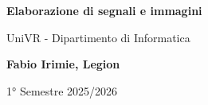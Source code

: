 \begin{titlepage}
	\begin{center}
		\vspace*{1cm}

		\Huge
		\textbf{Elaborazione di segnali e immagini}

		\vspace{0.5cm}
		\LARGE
		UniVR - Dipartimento di Informatica

		\vspace{1.5cm}

		\textbf{Fabio Irimie, Legion}

		\vfill


		\vspace{0.8cm}


		1° Semestre 2025/2026

	\end{center}
\end{titlepage}
